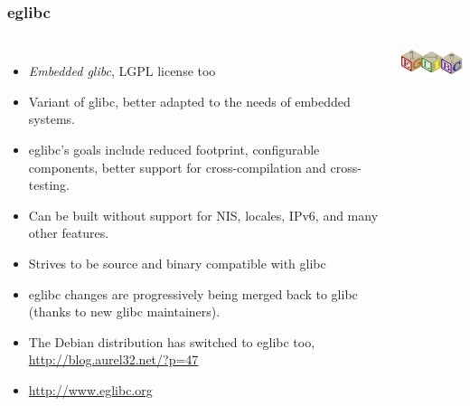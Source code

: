 \begin{frame}
  \frametitle{eglibc}
  \begin{columns}
    \begin{itemize}
    \item {\em Embedded glibc}, LGPL license too
    \item Variant of glibc, better adapted
      to the needs of embedded systems.
    \item eglibc's goals include reduced footprint, configurable
      components, better support for cross-compilation and
      cross-testing.
    \item Can be built without support for NIS, locales, IPv6, and many
      other features.
    \item Strives to be source and binary compatible with glibc
    \item eglibc changes are progressively being merged back to glibc
      (thanks to new glibc maintainers). 
    \item The Debian distribution has switched to eglibc too,
      \url{http://blog.aurel32.net/?p=47}
    \item \url{http://www.eglibc.org}
    \end{itemize}
    \includegraphics[width=\textwidth]{slides/sysdev-toolchains-c-libraries/eglibc.png}
  \end{columns}
\end{frame}

